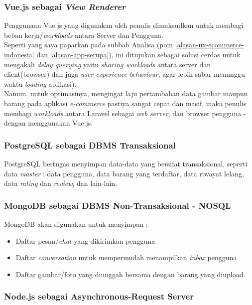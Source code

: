     
    \subsubsection{\textbf{Vue.js sebagai \textit{View Renderer} }}
Penggunaan Vue.js yang digunakan oleh penulis dimaksudkan untuk membagi beban kerja/\textit{workloads} antara Server dan Pengguna.
    \\
    Seperti yang saya paparkan pada subbab Analisa (poin \ref{alasan-ux-ecommerce-indonesia} dan \ref{alasan-app-serupa}), ini ditujukan sebagai solusi cerdas untuk mengakali \textit{delay querying} yaitu \textit{sharing workloads} antara server dan client(browser) dan juga \textit{user experience behaviour}, agar lebih sabar menunggu waktu \textit{loading} aplikasi).
    \\
    Namun, untuk optimasinya, mengingat laju pertambahan data gambar maupun barang pada aplikasi \textit{e-commerce} pastiya sangat cepat dan masif, maka penulis membagi \textit{workloads} antara Laravel sebagai \textit{web server}, dan browser pengguna - dengan menggunakan Vue.js.
    
    
    \subsubsection{\textbf{PostgreSQL sebagai DBMS Transaksional}}

    PostgreSQL bertugas menyimpan data-data yang bersifat transaksional, seperti data \textit{master} : data pengguna, data barang yang terdaftar, data riwayat lelang, data \textit{rating} dan \textit{review}, dan lain-lain.
    
    
    \subsubsection{\textbf{MongoDB} sebagai DBMS Non-Transaksional - NOSQL}
    
    MongoDB akan digunakan untuk menyimpan :
    \begin{itemize}[noitemsep,topsep=0pt]
    \item Daftar pesan/\textit{chat} yang dikirimkan pengguna
    \item Daftar \textit{conversation} untuk mempermudah menampilkan \textit{inbox} pengguna
    \item Daftar gambar/foto yang diunggah bersama dengan barang yang diupload.
    \end{itemize}

	\subsubsection{\textbf{Node.js} sebagai Asynchronous-Request Server}
    

